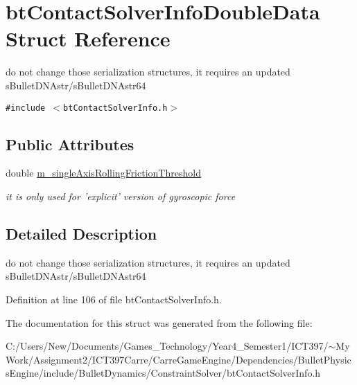 \hypertarget{structbt_contact_solver_info_double_data}{
\section{btContactSolverInfoDoubleData Struct Reference}
\label{structbt_contact_solver_info_double_data}
}
do not change those serialization structures, it requires an updated sBulletDNAstr/sBulletDNAstr64  


{\tt \#include $<$btContactSolverInfo.h$>$}

\subsection*{Public Attributes}
\begin{CompactItemize}
\item 
\hypertarget{structbt_contact_solver_info_double_data_9fb9abe1a4fa5c342f93fe3867093d31}{
double \hyperlink{structbt_contact_solver_info_double_data_9fb9abe1a4fa5c342f93fe3867093d31}{m\_\-singleAxisRollingFrictionThreshold}}
\label{structbt_contact_solver_info_double_data_9fb9abe1a4fa5c342f93fe3867093d31}

\begin{CompactList}\small\item\em it is only used for 'explicit' version of gyroscopic force \item\end{CompactList}\end{CompactItemize}


\subsection{Detailed Description}
do not change those serialization structures, it requires an updated sBulletDNAstr/sBulletDNAstr64 

Definition at line 106 of file btContactSolverInfo.h.

The documentation for this struct was generated from the following file:\begin{CompactItemize}
\item 
C:/Users/New/Documents/Games\_\-Technology/Year4\_\-Semester1/ICT397/$\sim$My Work/Assignment2/ICT397Carre/CarreGameEngine/Dependencies/BulletPhysicsEngine/include/BulletDynamics/ConstraintSolver/btContactSolverInfo.h\end{CompactItemize}
